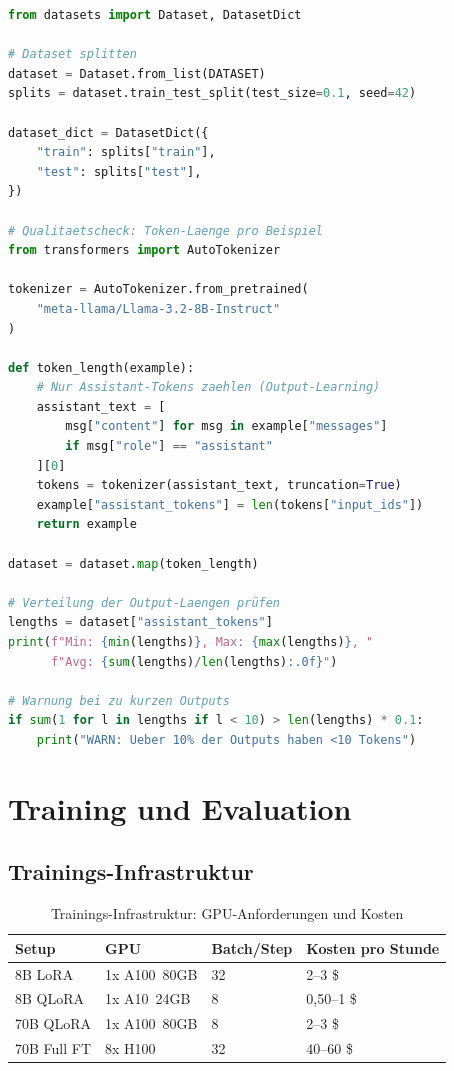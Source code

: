 \begin{lstlisting}[language=Python, caption=Dataset-Validierung und Splits]
from datasets import Dataset, DatasetDict

# Dataset splitten
dataset = Dataset.from_list(DATASET)
splits = dataset.train_test_split(test_size=0.1, seed=42)

dataset_dict = DatasetDict({
    "train": splits["train"],
    "test": splits["test"],
})

# Qualitaetscheck: Token-Laenge pro Beispiel
from transformers import AutoTokenizer

tokenizer = AutoTokenizer.from_pretrained(
    "meta-llama/Llama-3.2-8B-Instruct"
)

def token_length(example):
    # Nur Assistant-Tokens zaehlen (Output-Learning)
    assistant_text = [
        msg["content"] for msg in example["messages"]
        if msg["role"] == "assistant"
    ][0]
    tokens = tokenizer(assistant_text, truncation=True)
    example["assistant_tokens"] = len(tokens["input_ids"])
    return example

dataset = dataset.map(token_length)

# Verteilung der Output-Laengen prüfen
lengths = dataset["assistant_tokens"]
print(f"Min: {min(lengths)}, Max: {max(lengths)}, "
      f"Avg: {sum(lengths)/len(lengths):.0f}")

# Warnung bei zu kurzen Outputs
if sum(1 for l in lengths if l < 10) > len(lengths) * 0.1:
    print("WARN: Ueber 10% der Outputs haben <10 Tokens")
\end{lstlisting}

\section{Training und Evaluation}

\subsection{Trainings-Infrastruktur}

\begin{table}[H]
\centering
\begin{tabularx}{\linewidth}{lXXX}
\toprule
\textbf{Setup} & \textbf{GPU} & \textbf{Batch/Step} & \textbf{Kosten pro Stunde} \\
\midrule
8B LoRA & 1x A100~80GB & 32 & 2--3 \$ \\
8B QLoRA & 1x A10~24GB & 8 & 0,50--1 \$ \\
70B QLoRA & 1x A100~80GB & 8 & 2--3 \$ \\
70B Full FT & 8x H100 & 32 & 40--60 \$ \\
\bottomrule
\end{tabularx}
\caption{Trainings-Infrastruktur: GPU-Anforderungen und Kosten}
\label{tab:train-setup}
\end{table}

